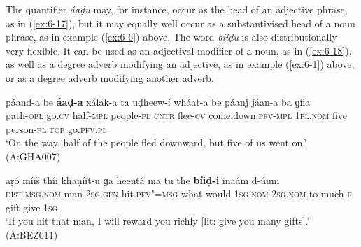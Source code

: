 The quantifier \textit{áaḍu} may, for instance, occur as the head of an adjective phrase, as in (\ref{ex:6-17}), but it may equally well occur as a substantivised head of a noun phrase, as in example (\ref{ex:6-6}) above. The word \textit{bíiḍu} is also distributionally very flexible. It can be used as an adjectival modifier of a noun, as in (\ref{ex:6-18}), as well as a degree adverb modifying an adjective, as in example (\ref{ex:6-1}) above, or as a degree adverb modifying another adverb.


\begin{exe}
\ex
\label{ex:6-17}
\gll páand-a be \textbf{áaḍ-a} xálak-a ta uḍheew-í wháat-a be páanǰ ǰáan-a ba ɡíia \\
path-\textsc{obl} go.\textsc{cv} half-\textsc{mpl} people-\textsc{pl} \textsc{cntr} flee-\textsc{cv} come.down.\textsc{pfv-mpl} \textsc{1pl.nom} five person-\textsc{pl} \textsc{top} go.\textsc{pfv.pl}\\
\glt `On the way, half of the people fled downward, but five of us went on.'
(A:GHA007)

\ex
\label{ex:6-18}
\gll aṛó míiš thíi khaṇíit-u ɡa heentá ma tu the \textbf{bíiḍ-i} inaám d-úum \\
\textsc{dist.msg.nom} man \textsc{2sg.gen} hit.\textsc{pfv"=msg} what would \textsc{1}\textsc{sg.nom} 
\textsc{2sg.nom} to much-\textsc{f} gift give-\textsc{1}\textsc{sg} \\
\glt `If you hit that man, I will reward you richly [lit: give you many gifts].' (A:BEZ011)
\end{exe}



